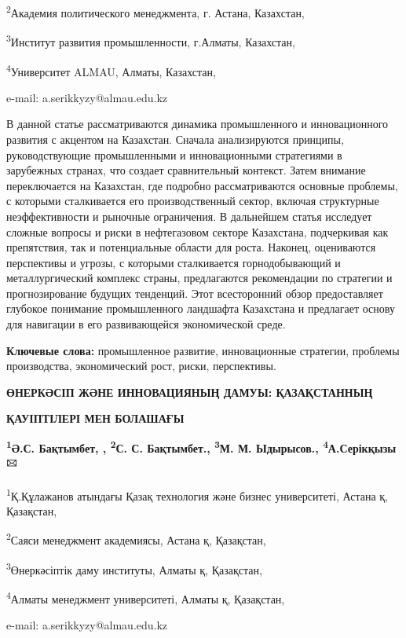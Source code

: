 \textsuperscript{2}Академия политического менеджмента, г. Астана,
Казахстан,

\textsuperscript{3}Институт развития промышленности, г.Алматы,
Казахстан,

\textsuperscript{4}Университет ALMAU, Алматы, Казахстан,

e-mail: a.serikkyzy@almau.edu.kz

В данной статье рассматриваются динамика промышленного и инновационного
развития с акцентом на Казахстан. Сначала анализируются принципы,
руководствующие промышленными и инновационными стратегиями в зарубежных
странах, что создает сравнительный контекст. Затем внимание
переключается на Казахстан, где подробно рассматриваются основные
проблемы, с которыми сталкивается его производственный сектор, включая
структурные неэффективности и рыночные ограничения. В дальнейшем статья
исследует сложные вопросы и риски в нефтегазовом секторе Казахстана,
подчеркивая как препятствия, так и потенциальные области для роста.
Наконец, оцениваются перспективы и угрозы, с которыми сталкивается
горнодобывающий и металлургический комплекс страны, предлагаются
рекомендации по стратегии и прогнозирование будущих тенденций. Этот
всесторонний обзор предоставляет глубокое понимание промышленного
ландшафта Казахстана и предлагает основу для навигации в его
развивающейся экономической среде.

{\bfseries Ключевые слова:} промышленное развитие, инновационные стратегии,
проблемы производства, экономический рост, риски, перспективы.

{\bfseries ӨНЕРКӘСІП ЖӘНЕ ИННОВАЦИЯНЫҢ ДАМУЫ: ҚАЗАҚСТАННЫҢ}

{\bfseries ҚАУІПТІЛЕРІ МЕН БОЛАШАҒЫ}

{\bfseries \textsuperscript{1}Ә.С. Бақтымбет, , \textsuperscript{2}С. С.
Бақтымбет., \textsuperscript{3}М. М. Ыдырысов.,
\textsuperscript{4}А.Серікқызы\textsuperscript{🖂}}

\textsuperscript{1}Қ.Құлажанов атындағы Қазақ технология және бизнес
университеті, Астана қ, Қазақстан,

\textsuperscript{2}Саяси менеджмент академиясы, Астана қ, Қазақстан,

\textsuperscript{3}Өнеркәсіптік даму институты, Алматы қ, Қазақстан,

\textsuperscript{4}Алматы менеджмент университеті, Алматы қ, Қазақстан,

e-mail: a.serikkyzy@almau.edu.kz

